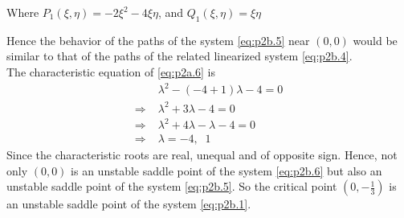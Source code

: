 \documentclass[../main-sheet.tex]{subfiles}
\begin{document}
\begin{soln}[b]
\begin{enumerate}[label=(\roman*)]
        Where \(P_1(\xi,\eta)=-2\xi^2-4\xi\eta\), and \(Q_1(\xi,\eta)=\xi\eta\)
    \end{enumerate}
    Hence the behavior of the paths of the system \eqref{eq:p2b.5} near \((0,0)\) would be similar to that of the paths of the related linearized system \eqref{eq:p2b.4}.\\
    The characteristic equation of \eqref{eq:p2a.6} is
    \begin{align*}
        &\lambda^2-(-4+1)\lambda-4=0\\
        \Rightarrow\;&\lambda^2+3\lambda-4=0\\
        \Rightarrow\;&\lambda^2+4\lambda-\lambda-4=0\\
        \Rightarrow\;&\lambda=-4,\;\;1
    \end{align*}
    Since the characteristic roots are real, unequal and of opposite sign. Hence, not only \((0,0)\) is an unstable saddle point of the system \eqref{eq:p2b.6} but also an unstable saddle point of the system \eqref{eq:p2b.5}. So the critical
    point \((0,-\frac{1}{3})\) is an unstable saddle point of the system \eqref{eq:p2b.1}.\\
    

\end{soln}
\end{document}
